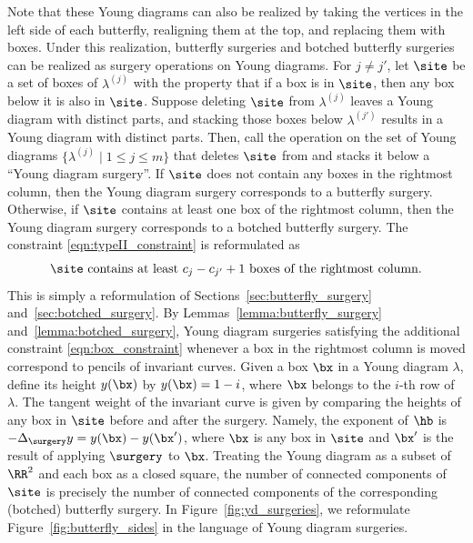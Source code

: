 Note that these Young diagrams can also be realized by taking the vertices in the left side of each butterfly, realigning them at the top, and replacing them with boxes. Under this realization, butterfly surgeries and botched butterfly surgeries can be realized as surgery operations on Young diagrams. For $j\neq j'$, let $\site$ be a set of boxes of $\lambda^{(j)}$ with the property that if a box is in $\site$, then any box below it is also in $\site$. Suppose deleting $\site$ from $\lambda^{(j)}$ leaves a Young diagram with distinct parts, and stacking those boxes below $\lambda^{(j')}$ results in a Young diagram with distinct parts. Then, call the operation on the set of Young diagrams $\big\{\lambda^{(j)} \mid 1\leq j \leq m\big\}$ that deletes $\site$ from  and stacks it below  a ``Young diagram surgery''. If $\site$ does not contain any boxes in the rightmost column, then the Young diagram surgery corresponds to a butterfly surgery. Otherwise, if $\site$ contains at least one box of the rightmost column, then the Young diagram surgery corresponds to a botched butterfly surgery. The constraint \eqref{eqn:typeII_constraint} is reformulated as
\begin{equation} \label{eqn:box_constraint}
\site\text{ contains at least }c_j - c_{j'} + 1\text{ boxes of the rightmost column.}
\end{equation}
This is simply a reformulation of Sections~\ref{sec:butterfly_surgery} and~\ref{sec:botched_surgery}. By Lemmas~\ref{lemma:butterfly_surgery} and~\ref{lemma:botched_surgery}, Young diagram surgeries satisfying the additional constraint \eqref{eqn:box_constraint} whenever a box in the rightmost column is moved correspond to pencils of invariant curves. Given a box $\bx$ in a Young diagram $\lambda$, define its height $y(\bx)$ by $y(\bx) = 1 - i$, where $\bx$ belongs to the $i$-th row of $\lambda$. The tangent weight of the invariant curve is given by comparing the heights of any box in $\site$ before and after the surgery. Namely, the exponent of $\hb$ is $-\Delta_\surgery y = y(\bx)-y(\bx')$, where $\bx$ is any box in $\site$ and $\bx'$ is the result of applying $\surgery$ to $\bx$. Treating the Young diagram as a subset of $\RR^2$ and each box as a closed square, the number of connected components of $\site$ is precisely the number of connected components of the corresponding (botched) butterfly surgery. In Figure~\ref{fig:yd_surgeries}, we reformulate Figure~\ref{fig:butterfly_sides} in the language of Young diagram surgeries.

